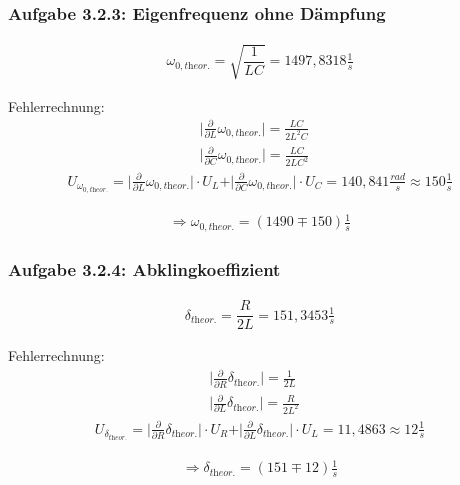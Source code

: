 \documentclass[a4paper]{scrartcl}
\numberwithin{equation}{subsection}
\begin{document}
\subsubsection{Aufgabe 3.2.3: Eigenfrequenz ohne Dämpfung}

\begin{align}
\omega_{0,\textit{theor.}} = \sqrt{\dfrac{1}{LC}}= 1497,8318 \frac{1}{s}
\end{align}

Fehlerrechnung:
\begin{align*}
\vert \frac{\partial}{\partial L}\omega_{0,\textit{theor.}}\vert = \frac{LC}{2L^2C} &\\
\vert \frac{\partial}{\partial C}\omega_{0,\textit{theor.}}\vert = \frac{LC}{2LC^2} &
\end{align*}
\begin{align*}
U_{\omega_{0,\textit{theor.}}} = \vert \frac{\partial}{\partial L}\omega_{0,\textit{theor.}}\vert \cdot U_L + \vert \frac{\partial}{\partial C}\omega_{0,\textit{theor.}}\vert \cdot U_C = 140,841 \frac{rad}{s} \approx 150 \frac{1}{s}
\end{align*}

\begin{align*}
\Rightarrow \omega_{0,\textit{theor.}} = (1490 \mp 150) \frac{1}{s}
\end{align*}

\subsubsection{Aufgabe 3.2.4: Abklingkoeffizient}

\begin{align}
\delta_{\textit{theor.}} = \dfrac{R}{2L}= 151,3453 \frac{1}{s}
\end{align}

Fehlerrechnung:
\begin{align*}
\vert \frac{\partial}{\partial R}\delta_{\textit{theor.}}\vert = \frac{1}{2L} &\\
\vert \frac{\partial}{\partial L}\delta_{\textit{theor.}}\vert = \frac{R}{2L^2} &
\end{align*}
\begin{align*}
U_{\delta_{\textit{theor.}}} = \vert \frac{\partial}{\partial R}\delta_{\textit{theor.}}\vert \cdot U_R + \vert \frac{\partial}{\partial L}\delta_{\textit{theor.}}\vert \cdot U_L = 11,4863 \approx 12  \frac{1}{s}
\end{align*}

\begin{align*}
\Rightarrow \delta_{\textit{theor.}} = (151 \mp 12) \frac{1}{s}
\end{align*}
\end{document}
